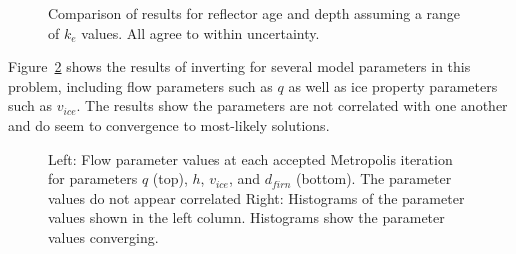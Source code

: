 \begin{figure}[ht]
\begin{center}
{}
\caption[scale=0.3]{Comparison of results for reflector age and depth assuming a range of $k_e$ values. All agree to within uncertainty.}
\end{center}
\label{fig:ke}
\end{figure}

Figure~\ref{fig:flowparamconvergence} shows the results of inverting for several model parameters in this problem, including flow parameters such as $q$ as well as ice property parameters such as $v_{ice}$. The results show the parameters are not correlated with one another and do seem to convergence to most-likely solutions.

\begin{figure}[ht]
\centering
{}
\caption[]{Left: Flow parameter values at each accepted Metropolis iteration for parameters $q$ (top), $h$, $v_{ice}$, and $d_{firn}$ (bottom). The parameter values do not appear correlated Right: Histograms of the parameter values shown in the left column. Histograms show the parameter values converging.}
\label{fig:flowparamconvergence}
\end{figure}

